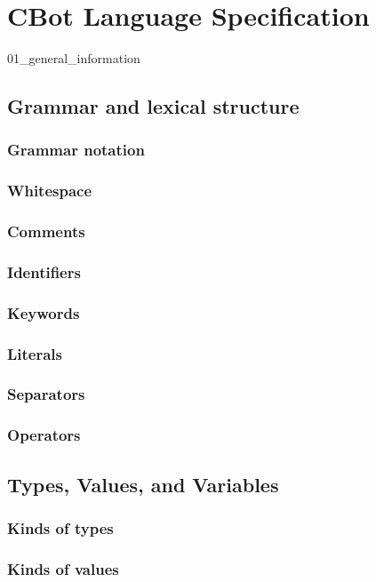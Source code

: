 
\part{CBot Language Specification}

{01_general_information}


\chapter{Grammar and lexical structure}
\section{Grammar notation}
\section{Whitespace}
\section{Comments}
\section{Identifiers}
\section{Keywords}
\section{Literals}
\section{Separators}
\section{Operators}


\chapter{Types, Values, and Variables}
\section{Kinds of types}
\section{Kinds of values}

